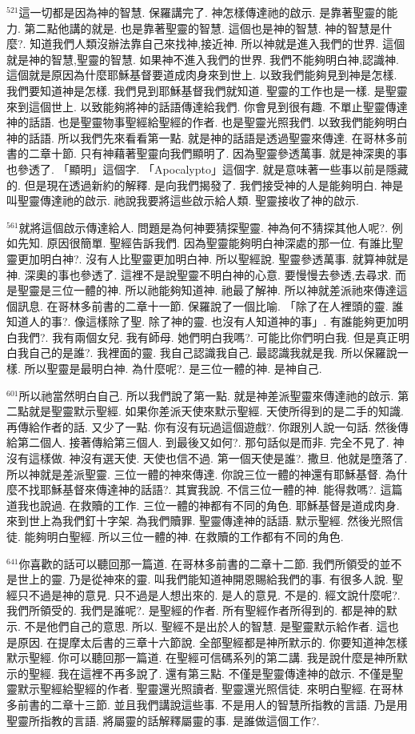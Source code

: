 \documentclass{book}
\begin{document}
$^{521}$這一切都是因為神的智慧.
保羅講完了.
神怎樣傳達祂的啟示.
是靠著聖靈的能力.
第二點他講的就是.
也是靠著聖靈的智慧.
這個也是神的智慧.
神的智慧是什麼?.
知道我們人類沒辦法靠自己來找神,接近神.
所以神就是進入我們的世界.
這個就是神的智慧,聖靈的智慧.
如果神不進入我們的世界.
我們不能夠明白神,認識神.
這個就是原因為什麼耶穌基督要道成肉身來到世上.
以致我們能夠見到神是怎樣.
我們要知道神是怎樣.
我們見到耶穌基督我們就知道.
聖靈的工作也是一樣.
是聖靈來到這個世上.
以致能夠將神的話語傳達給我們.
你會見到很有趣.
不單止聖靈傳達神的話語.
也是聖靈物事聖經給聖經的作者.
也是聖靈光照我們.
以致我們能夠明白神的話語.
所以我們先來看看第一點.
就是神的話語是透過聖靈來傳達.
在哥林多前書的二章十節.
只有神藉著聖靈向我們顯明了.
因為聖靈參透萬事.
就是神深奧的事也參透了.
「顯明」這個字.
「Apocalypto」這個字.
就是意味著一些事以前是隱藏的.
但是現在透過新約的解釋.
是向我們揭發了.
我們接受神的人是能夠明白.
神是叫聖靈傳達祂的啟示.
祂說我要將這些啟示給人類.
聖靈接收了神的啟示.

$^{561}$就將這個啟示傳達給人.
問題是為何神要猜探聖靈.
神為何不猜探其他人呢?.
例如先知.
原因很簡單.
聖經告訴我們.
因為聖靈能夠明白神深處的那一位.
有誰比聖靈更加明白神?.
沒有人比聖靈更加明白神.
所以聖經說.
聖靈參透萬事.
就算神就是神.
深奧的事也參透了.
這裡不是說聖靈不明白神的心意.
要慢慢去參透,去尋求.
而是聖靈是三位一體的神.
所以祂能夠知道神.
祂最了解神.
所以神就差派祂來傳達這個訊息.
在哥林多前書的二章十一節.
保羅說了一個比喻.
「除了在人裡頭的靈.
誰知道人的事?.
像這樣除了聖.
除了神的靈.
也沒有人知道神的事」.
有誰能夠更加明白我們?.
我有兩個女兒.
我有師母.
她們明白我嗎?.
可能比你們明白我.
但是真正明白我自己的是誰?.
我裡面的靈.
我自己認識我自己.
最認識我就是我.
所以保羅說一樣.
所以聖靈是最明白神.
為什麼呢?.
是三位一體的神.
是神自己.

$^{601}$所以祂當然明白自己.
所以我們說了第一點.
就是神差派聖靈來傳達祂的啟示.
第二點就是聖靈默示聖經.
如果你差派天使來默示聖經.
天使所得到的是二手的知識.
再傳給作者的話.
又少了一點.
你有沒有玩過這個遊戲?.
你跟別人說一句話.
然後傳給第二個人.
接著傳給第三個人.
到最後又如何?.
那句話似是而非.
完全不見了.
神沒有這樣做.
神沒有選天使.
天使也信不過.
第一個天使是誰?.
撒旦.
他就是墮落了.
所以神就是差派聖靈.
三位一體的神來傳達.
你說三位一體的神還有耶穌基督.
為什麼不找耶穌基督來傳達神的話語?.
其實我說.
不信三位一體的神.
能得救嗎?.
這篇道我也說過.
在救贖的工作.
三位一體的神都有不同的角色.
耶穌基督是道成肉身.
來到世上為我們釘十字架.
為我們贖罪.
聖靈傳達神的話語.
默示聖經.
然後光照信徒.
能夠明白聖經.
所以三位一體的神.
在救贖的工作都有不同的角色.

$^{641}$你喜歡的話可以聽回那一篇道.
在哥林多前書的二章十二節.
我們所領受的並不是世上的靈.
乃是從神來的靈.
叫我們能知道神開恩賜給我們的事.
有很多人說.
聖經只不過是神的意見.
只不過是人想出來的.
是人的意見.
不是的.
經文說什麼呢?.
我們所領受的.
我們是誰呢?.
是聖經的作者.
所有聖經作者所得到的.
都是神的默示.
不是他們自己的意思.
所以.
聖經不是出於人的智慧.
是聖靈默示給作者.
這也是原因.
在提摩太后書的三章十六節說.
全部聖經都是神所默示的.
你要知道神怎樣默示聖經.
你可以聽回那一篇道.
在聖經可信碼系列的第二講.
我是說什麼是神所默示的聖經.
我在這裡不再多說了.
還有第三點.
不僅是聖靈傳達神的啟示.
不僅是聖靈默示聖經給聖經的作者.
聖靈還光照讀者.
聖靈還光照信徒.
來明白聖經.
在哥林多前書的二章十三節.
並且我們講說這些事.
不是用人的智慧所指教的言語.
乃是用聖靈所指教的言語.
將屬靈的話解釋屬靈的事.
是誰做這個工作?.
\end{document}
